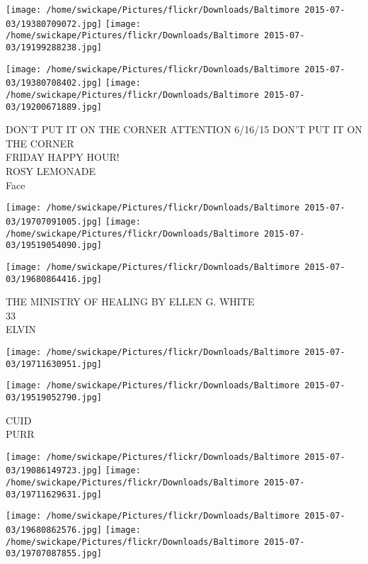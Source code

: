 \documentclass[10pt,letterpaper]{article}
\begin{document}
\texttt{[image: /home/swickape/Pictures/flickr/Downloads/Baltimore 2015-07-03/19380709072.jpg]}
\texttt{[image: /home/swickape/Pictures/flickr/Downloads/Baltimore 2015-07-03/19199288238.jpg]}

\texttt{[image: /home/swickape/Pictures/flickr/Downloads/Baltimore 2015-07-03/19380708402.jpg]}
\texttt{[image: /home/swickape/Pictures/flickr/Downloads/Baltimore 2015-07-03/19200671889.jpg]}

DON'T PUT IT ON THE CORNER ATTENTION 6/16/15 DON'T PUT IT ON THE CORNER\\
FRIDAY HAPPY HOUR!\\
ROSY LEMONADE\\
Face\\
\pagebreak

\texttt{[image: /home/swickape/Pictures/flickr/Downloads/Baltimore 2015-07-03/19707091005.jpg]}
\texttt{[image: /home/swickape/Pictures/flickr/Downloads/Baltimore 2015-07-03/19519054090.jpg]}

\vspace{0.25in}
\texttt{[image: /home/swickape/Pictures/flickr/Downloads/Baltimore 2015-07-03/19680864416.jpg]}

THE MINISTRY OF HEALING BY ELLEN G. WHITE\\
33\\
ELVIN\\
\pagebreak

\texttt{[image: /home/swickape/Pictures/flickr/Downloads/Baltimore 2015-07-03/19711630951.jpg]}

\vspace{0.25in}
\texttt{[image: /home/swickape/Pictures/flickr/Downloads/Baltimore 2015-07-03/19519052790.jpg]}

CUID\\
PURR\\
\pagebreak

\texttt{[image: /home/swickape/Pictures/flickr/Downloads/Baltimore 2015-07-03/19086149723.jpg]}
\texttt{[image: /home/swickape/Pictures/flickr/Downloads/Baltimore 2015-07-03/19711629631.jpg]}

\texttt{[image: /home/swickape/Pictures/flickr/Downloads/Baltimore 2015-07-03/19680862576.jpg]}
\texttt{[image: /home/swickape/Pictures/flickr/Downloads/Baltimore 2015-07-03/19707087855.jpg]}
\end{document}

